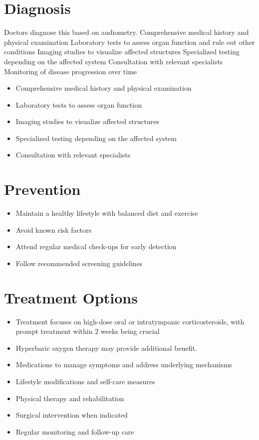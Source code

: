 \section{Diagnosis}
Doctors diagnose this based on audiometry. Comprehensive medical history and physical examination Laboratory tests to assess organ function and rule out other conditions Imaging studies to visualize affected structures Specialized testing depending on the affected system Consultation with relevant specialists Monitoring of disease progression over time

\begin{itemize}[noitemsep]
  \item Comprehensive medical history and physical examination
  \item Laboratory tests to assess organ function
  \item Imaging studies to visualize affected structures
  \item Specialized testing depending on the affected system
  \item Consultation with relevant specialists
\end{itemize}
\section{Prevention}
\begin{itemize}[noitemsep]
  \item Maintain a healthy lifestyle with balanced diet and exercise
  \item Avoid known risk factors
  \item Attend regular medical check-ups for early detection
  \item Follow recommended screening guidelines
\end{itemize}
\section{Treatment Options}
\begin{itemize}[noitemsep]
  \item Treatment focuses on high-dose oral or intratympanic corticosteroids, with prompt treatment within 2 weeks being crucial
  \item Hyperbaric oxygen therapy may provide additional benefit.
  \item Medications to manage symptoms and address underlying mechanisms
  \item Lifestyle modifications and self-care measures
  \item Physical therapy and rehabilitation
  \item Surgical intervention when indicated
  \item Regular monitoring and follow-up care
\end{itemize}
